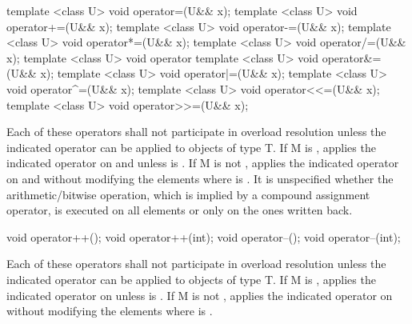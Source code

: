 \begin{itemdecl}
template <class U> void operator=(U&& x);
template <class U> void operator+=(U&& x);
template <class U> void operator-=(U&& x);
template <class U> void operator*=(U&& x);
template <class U> void operator/=(U&& x);
template <class U> void operator%
template <class U> void operator&=(U&& x);
template <class U> void operator|=(U&& x);
template <class U> void operator^=(U&& x);
template <class U> void operator<<=(U&& x);
template <class U> void operator>>=(U&& x);
\end{itemdecl}
\begin{itemdescr}
  \pnum\remarks Each of these operators shall not participate in overload resolution unless the indicated operator can be applied to objects of type \type T.
  \pnum\effects
  If \type M is \bool, applies the indicated operator on  and  unless  is \false.
  If \type M is not \bool, applies the indicated operator on  and  without modifying the elements  where  is \false \foralli[M::].
  \pnum\remarks It is unspecified whether the arithmetic/bitwise operation, which is implied by a compound assignment operator, is executed on all elements or only on the ones written back.
\end{itemdescr}

\begin{itemdecl}
void operator++();
void operator++(int);
void operator--();
void operator--(int);
\end{itemdecl}
\begin{itemdescr}
  \pnum\remarks Each of these operators shall not participate in overload resolution unless the indicated operator can be applied to objects of type \type T.
  \pnum\effects
  If \type M is \bool, applies the indicated operator on  unless  is \false.
  If \type M is not \bool, applies the indicated operator on  without modifying the elements  where  is \false \foralli[M::].
\end{itemdescr}

